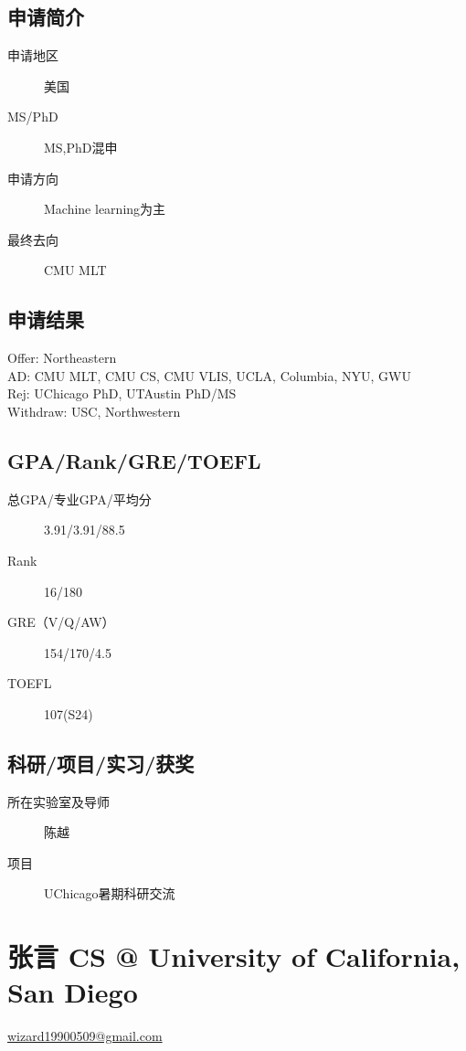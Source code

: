 \documentclass[11pt,fleqn,openany]{book} %
\begin{document}
\noindent\begin{minipage}[t]{0.45\textwidth}
\subsection*{申请简介}
\begin{description}
\item[申请地区] 美国
\item[MS/PhD] MS,PhD混申
\item[申请方向] Machine learning为主
\item[最终去向] CMU MLT
\end{description}
\end{minipage}
\hfill
\begin{minipage}[t]{0.45\textwidth}
\subsection*{申请结果}
\noindent Offer: Northeastern\\
AD: CMU MLT, CMU CS, CMU VLIS, UCLA, Columbia, NYU, GWU\\
Rej: UChicago PhD, UTAustin PhD/MS\\
Withdraw: USC, Northwestern
\end{minipage}
\subsection*{GPA/Rank/GRE/TOEFL}
\begin{description}
\item[总GPA/专业GPA/平均分] 3.91/3.91/88.5
\item[Rank] 16/180
\item[GRE（V/Q/AW）] 154/170/4.5
\item[TOEFL] 107(S24)
\end{description}

\subsection*{科研/项目/实习/获奖}
\begin{description}
\item[所在实验室及导师] 陈越
\item[项目] UChicago暑期科研交流
\end{description}
\clearpage
\section{张言 CS @ University of California, San Diego}
\hfill \href{mailto:wizard19900509@gmail.com}{wizard19900509@gmail.com}
\end{document}
